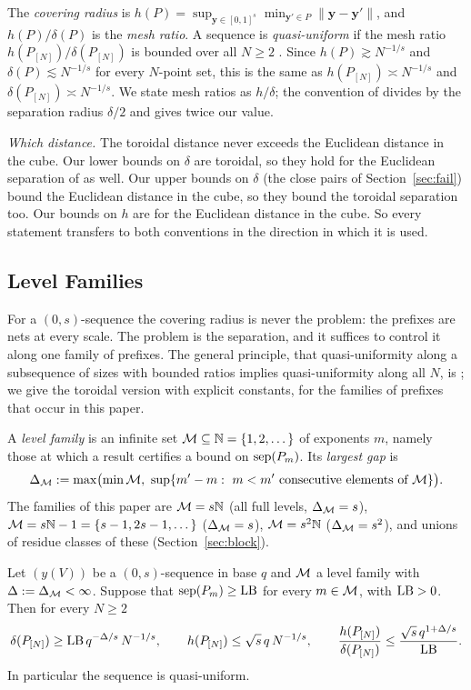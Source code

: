 The \emph{covering radius} is $h(P)=\sup_{\mathbf y\in[0,1]^s}\min_{\mathbf y'\in P}\|\mathbf y-\mathbf y'\|$, and $h(P)/\delta(P)$ is the \emph{mesh ratio}. A sequence is \emph{quasi-uniform} if the mesh ratio $h(P_{[N]})/\delta(P_{[N]})$ is bounded over all $N\ge2$ \cite{DGLPS1,DGS2}. Since $h(P)\gtrsim N^{-1/s}$ and $\delta(P)\lesssim N^{-1/s}$ for every $N$-point set, this is the same as $h(P_{[N]})\asymp N^{-1/s}$ and $\delta(P_{[N]})\asymp N^{-1/s}$. We state mesh ratios as $h/\delta$; the convention of \cite{DGS2} divides by the separation radius $\delta/2$ and gives twice our value.

\emph{Which distance.} The toroidal distance never exceeds the Euclidean distance in the cube. Our lower bounds on $\delta$ are toroidal, so they hold for the Euclidean separation of \cite{DGLPS1,DGS2,GHS26} as well. Our upper bounds on $\delta$ (the close pairs of Section~\ref{sec:fail}) bound the Euclidean distance in the cube, so they bound the toroidal separation too. Our bounds on $h$ are for the Euclidean distance in the cube. So every statement transfers to both conventions in the direction in which it is used.

\subsection{Level Families}\label{sec:levels}
For a $(0,s)$-sequence the covering radius is never the problem: the prefixes are nets at every scale. The problem is the separation, and it suffices to control it along one family of prefixes. The general principle, that quasi-uniformity along a subsequence of sizes with bounded ratios implies quasi-uniformity along all $N$, is \cite[Lemma~1.3]{DGLPS1}; we give the toroidal version with explicit constants, for the families of prefixes that occur in this paper.

A \emph{level family} is an infinite set $\mathcal{M}\subseteq\mathbb{N}=\{1,2,\dots\}$ of exponents $m$, namely those at which a result certifies a bound on $\operatorname{sep}(P_m)$. Its \emph{largest gap} is
\[
\Delta_{\Lev}:=\max\bigl(\min\Lev,\ \sup\{m'-m:\ m<m'\text{ consecutive elements of }\Lev\}\bigr).
\]
The families of this paper are $\mathcal{M}=s\mathbb{N}$ (all full levels, $\Delta_{\mathcal{M}}=s$), $\mathcal{M}=s\mathbb{N}-1=\{s-1,2s-1,\dots\}$ ($\Delta_{\mathcal{M}}=s$), $\mathcal{M}=s^2\mathbb{N}$ ($\Delta_{\mathcal{M}}=s^2$), and unions of residue classes of these (Section~\ref{sec:block}).

\begin{lemma}\label{lem:prefix}
Let $(y(V))$ be a $(0,s)$-sequence in base $q$ and $\mathcal{M}$ a level family with $\Delta:=\Delta_{\mathcal{M}}<\infty$. Suppose that $\operatorname{sep}(P_m)\ge\mathrm{LB}$ for every $m\in\mathcal{M}$, with $\mathrm{LB}>0$. Then for every $N\ge2$
\[
\delta(P_{[N]})\ge\mathrm{LB}\,q^{-\Delta/s}\,N^{-1/s},\qquad h(P_{[N]})\le\sqrt s\,q\,N^{-1/s},\qquad \frac{h(P_{[N]})}{\delta(P_{[N]})}\le\frac{\sqrt s\,q^{1+\Delta/s}}{\mathrm{LB}}.
\]
In particular the sequence is quasi-uniform.
\end{lemma}


